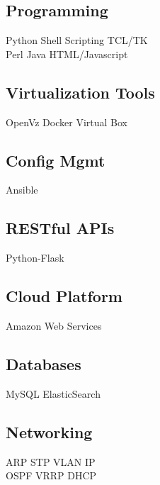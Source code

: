 \documentclass[letterpaper]{deedy-resume} %
\begin{document}
\begin{minipage}[t]{0.33\textwidth}
\subsection{Programming}
Python \textbullet{} Shell Scripting\textbullet{} TCL/TK \\
Perl \textbullet{} Java \textbullet{} HTML/Javascript

\sectionspace %
\sectionspace %

\subsection{Virtualization Tools}
OpenVz \textbullet{} Docker \textbullet{} Virtual Box 
\sectionspace %
\sectionspace %

\subsection{Config Mgmt}
Ansible 
\sectionspace %
\sectionspace %

\subsection{RESTful APIs}
Python-Flask
\sectionspace
\sectionspace %

\subsection{Cloud Platform}
Amazon Web Services 
\sectionspace 
\sectionspace %

\subsection{Databases}
MySQL \textbullet{} ElasticSearch 
\sectionspace %
\sectionspace %

\subsection{Networking}
ARP \textbullet{} STP \textbullet{} VLAN \textbullet{} IP  \\
OSPF \textbullet{} VRRP \textbullet{} DHCP
\sectionspace %

\end{minipage} %
\end{document}
